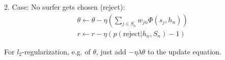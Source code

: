 \documentclass[10pt]{article}
\begin{document}
2. Case: No surfer gets chosen (reject):
\begin{eqnarray}
\theta \leftarrow \theta - \eta (\sum_{j \in S_n} w_{jn} \Phi(s_j,h_n))\\
r \leftarrow r - \eta (p(\text{reject} | h_n, S_n)-1)
\end{eqnarray}

For $l_2$-regularization, e.g. of $\theta$, just add $- \eta \lambda \theta$ to the update equation.
\end{document}
